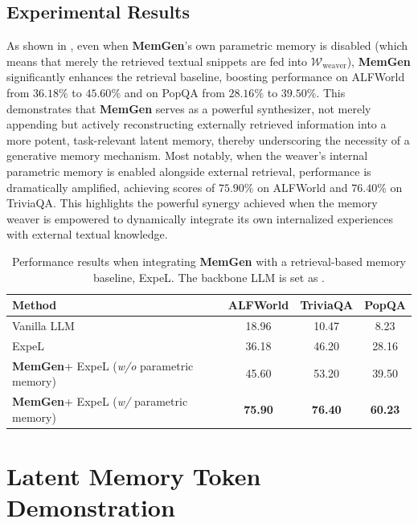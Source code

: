 \documentclass[]{fairmeta}
\newcommand{\ourmethod}{{\fontfamily{lmtt}\selectfont \textbf{MemGen}}\xspace}
\newcommand{\llmname}[1]{{\fontfamily{pcr}\selectfont {#1}}\xspace}
\begin{document}
\subsection{Experimental Results}
\vspace{-0.5em}
 As shown in , even when \ourmethod's own parametric memory is disabled (which means that merely the retrieved textual snippets are fed into $\mathcal{W}_\text{weaver}$), \ourmethod significantly enhances the retrieval baseline, boosting performance on ALFWorld from $36.18\%$ to $45.60\%$ and on PopQA from $28.16\%$ to $39.50\%$. This demonstrates that \ourmethod serves as a powerful synthesizer, not merely appending but actively reconstructing externally retrieved information into a more potent, task-relevant latent memory, thereby underscoring the necessity of a generative memory mechanism. Most notably, when the weaver's internal parametric memory is enabled alongside external retrieval, performance is dramatically amplified, achieving scores of $75.90\%$ on ALFWorld and $76.40\%$ on TriviaQA. This highlights the powerful synergy achieved when the memory weaver is empowered to dynamically integrate its own internalized experiences with external textual knowledge.

\begin{table}[h]
\centering
\caption{ Performance results when integrating \ourmethod with a retrieval-based memory baseline, ExpeL. The backbone LLM is set as \llmname{SmolLM3-3B}.}
\vspace{-0.5em}
\small
\label{tab:retrieval_results}
\begin{tabular}{lccc}
\toprule
\textbf{Method} & \textbf{ALFWorld} & \textbf{TriviaQA} & \textbf{PopQA} \\
\midrule
Vanilla LLM & 18.96 &  10.47 & 8.23 \\
ExpeL & 36.18 & 46.20 &  28.16   \\
\ourmethod + ExpeL (\textit{w/o} parametric memory) &  {45.60} &  {53.20} &  {39.50} \\
\ourmethod + ExpeL (\textit{w/} parametric memory) & \textbf{75.90} & \textbf{76.40} & \textbf{60.23} \\
\bottomrule
\end{tabular}
\end{table}

\section{Latent Memory Token Demonstration}\label{app:demonstration}
\end{document}
